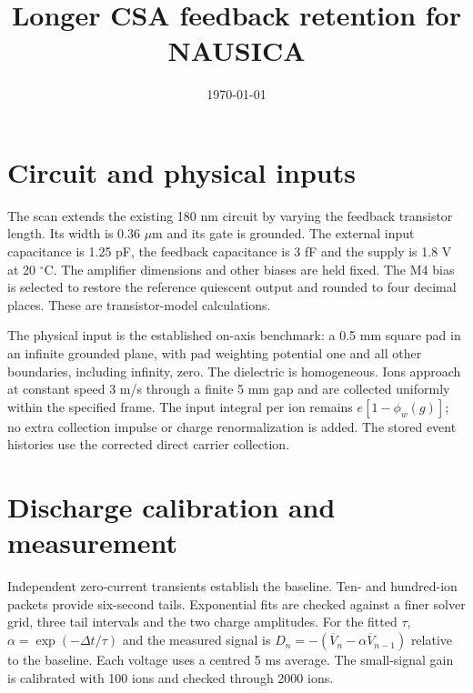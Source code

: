 \documentclass[10pt,a4paper]{article}
\title{Longer CSA feedback retention for NAUSICA}
\date{\today}
\begin{document}
\maketitle
\section{Circuit and physical inputs}
The scan extends the existing 180 nm circuit by varying the feedback transistor
length. Its width is 0.36 $\mu$m and its gate is grounded. The external input
capacitance is 1.25 pF, the feedback capacitance is 3 fF and the supply is 1.8 V
at 20 $^\circ$C. The amplifier dimensions and other biases are held fixed.
The M4 bias is selected to restore the reference quiescent output and rounded
to four decimal places. These are transistor-model calculations.

The physical input is the established on-axis benchmark: a 0.5 mm square pad in
an infinite grounded plane, with pad weighting potential one and all other
boundaries, including infinity, zero. The dielectric is homogeneous. Ions
approach at constant speed 3 m/s through a finite 5 mm gap and are collected
uniformly within the specified frame. The input integral per ion remains
$e[1-\phi_w(g)]$; no extra collection impulse or charge renormalization is added.
The stored event histories use the corrected direct carrier collection.

\section{Discharge calibration and measurement}
Independent zero-current transients establish the baseline. Ten- and hundred-ion
packets provide six-second tails. Exponential fits are checked against a finer
solver grid, three tail intervals and the two charge amplitudes.
For the fitted $\tau$, $\alpha=\exp(-\Delta t/\tau)$ and the measured signal is
$D_n=-(\overline V_n-\alpha\overline V_{n-1})$ relative to the baseline.
Each voltage uses a centred 5 ms average. The small-signal gain is calibrated
with 100 ions and checked through 2000 ions.
\end{document}
